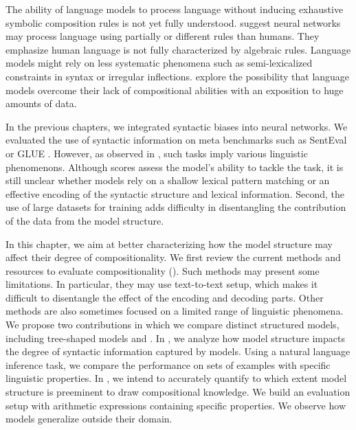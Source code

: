 The ability of language models to process language without inducing exhaustive symbolic composition rules is not yet fully understood. \textcite{baroni_19} suggest neural networks may process language using partially or different rules than humans. They emphasize human language is not fully characterized by algebraic rules. Language models might rely on less systematic phenomena such as semi-lexicalized constraints in syntax or irregular inflections. \textcite{lake_17} explore the possibility that language models overcome their lack of compositional abilities with an exposition to huge amounts of data.

In the previous chapters, we integrated syntactic biases into neural networks. We evaluated the use of syntactic information on meta benchmarks such as SentEval \parencite{conneau_18} or GLUE \parencite{wang_19}. However, as observed in \textcite{baroni_18}, such tasks imply various linguistic phenomenons. Although scores assess the model's ability to tackle the task, it is still unclear whether models rely on a shallow lexical pattern matching or an effective encoding of the syntactic structure and lexical information. Second, the use of large datasets for training \parencite{bowman_15, williams_18} adds difficulty in disentangling the contribution of the data from the model structure.

In this chapter, we aim at better characterizing how the model structure may affect their degree of compositionality. We first review the current methods and resources to evaluate compositionality (). Such methods may present some limitations. In particular, they may use text-to-text setup, which makes it difficult to disentangle the effect of the encoding and decoding parts. Other methods are also sometimes focused on a limited range of linguistic phenomena. We propose two contributions in which we compare distinct structured models, including tree-shaped models and \bert. In , we analyze how model structure impacts the degree of syntactic information captured by models. Using a natural language inference task, we compare the performance on sets of examples with specific linguistic properties. In , we intend to accurately quantify to which extent model structure is preeminent to draw compositional knowledge. We build an evaluation setup with arithmetic expressions containing specific properties. We observe how models generalize outside their domain.


